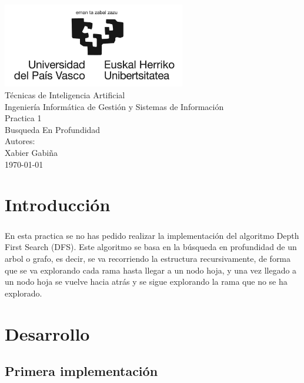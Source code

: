 \documentclass{report}
\begin{document}
    \begin{titlepage}
        \centering
        \includegraphics[width=0.6\textwidth]{./.img/logo.jpg}\\
        \vspace{1cm}
        \LARGE Técnicas de Inteligencia Artificial\\
        \vspace{0.5cm}
        \Large Ingeniería Informática de Gestión y Sistemas de Información\\
        \vspace{3cm}
        \Huge Practica 1\\
        \huge Busqueda En Profundidad\\
        \vspace{2.5cm}
        \Large Autores:\\
        \vspace{0.2cm}
        \large Xabier Gabiña\\
        \vfill
        \today
    \end{titlepage}
    \tableofcontents
    \listoffigures
    \listoftables
    \chapter{Introducción}
      \paragraph*{}{
        En esta practica se no has pedido realizar la implementación del algoritmo Depth First Search (DFS).
        Este algoritmo se basa en la búsqueda en profundidad de un arbol o grafo, es decir, se va recorriendo la estructura recursivamente, de forma que se va explorando cada rama hasta llegar a un nodo hoja, y una vez llegado a un nodo hoja se vuelve hacia atrás y se sigue explorando la rama que no se ha explorado.
      
      }
    \chapter{Desarrollo}
      \section{Primera implementación}
\end{document}
